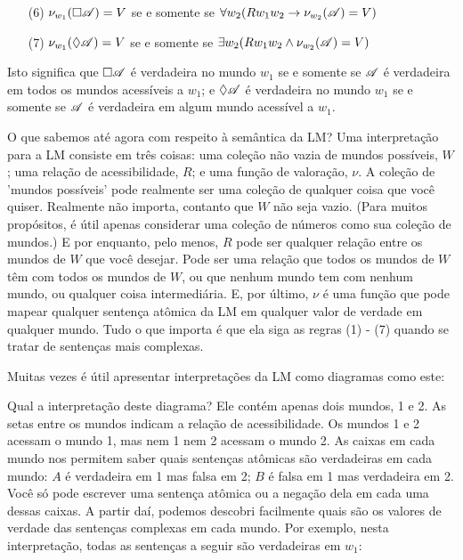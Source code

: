 \begin{itemize}
	\item[(6)]$\nu_{w_1}(\Box \mathscr{A})=V$ se e somente se  $\forall w_2 (Rw_1w_2\rightarrow \nu_{w_2}(\mathscr{A})=V)$
	\item[(7)]$\nu_{w_1}(\Diamond \mathscr{A})=V$ se e somente se  $\exists w_2 (Rw_1w_2\wedge \nu_{w_2}(\mathscr{A})=V)$
\end{itemize}
Isto significa que $\Box\mathscr{A}$ é verdadeira no mundo  $w_1$ se e somente se $\mathscr{A}$ é verdadeira em todos os mundos acessíveis a  $w_1$; e $\Diamond\mathscr{A}$ é verdadeira no mundo  $w_1$ se e somente se $\mathscr{A}$ é verdadeira em algum mundo acessível a  $w_1$.

O que sabemos até agora com respeito à semântica da LM?  Uma interpretação para a LM consiste em três coisas: uma coleção não vazia de mundos possíveis, $W$; uma relação de acessibilidade, $R$; e uma função de valoração, $\nu$. A coleção de 'mundos possíveis' pode realmente ser uma coleção de qualquer coisa que você quiser. Realmente não importa, contanto que $W$ não seja vazio. (Para muitos propósitos, é útil apenas considerar uma coleção de números como sua coleção de mundos.) E por enquanto, pelo menos, $R$ pode ser qualquer relação entre os mundos de $W$ que você desejar. Pode ser uma relação que todos os mundos de $W$ têm com todos os mundos de $W$, ou que nenhum mundo tem com nenhum mundo, ou qualquer coisa intermediária. E, por último, $\nu$ é uma função que pode mapear qualquer sentença atômica da LM em qualquer valor de verdade em qualquer mundo. Tudo o que importa é que ela siga as regras (1) - (7) quando se tratar de sentenças mais complexas.

 Muitas vezes é útil apresentar interpretações da LM como diagramas como este:
\begin{center}
\end{center}
Qual a interpretação deste diagrama? Ele contém apenas dois mundos,  1 e 2. As setas entre os mundos indicam a relação de acessibilidade. Os mundos 1 e  2 acessam o mundo 1, mas nem 1 nem 2 acessam o mundo 2. As caixas em cada mundo nos permitem saber quais sentenças atômicas são verdadeiras em cada mundo: $A$ é verdadeira em  1 mas  falsa em 2; $B$ é  falsa em 1 mas verdadeira em 2. Você só pode escrever uma sentença atômica ou a negação dela  em cada uma dessas caixas. A partir daí, podemos descobri facilmente  quais são   os valores de verdade das sentenças complexas em cada mundo. Por exemplo,  nesta interpretação, todas as sentenças a seguir são verdadeiras em  $w_1$: 
 
